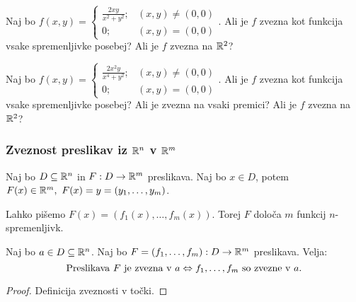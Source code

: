 \begin{zgled}
    Naj bo $f(x,y) = \begin{cases}
        \frac{2xy}{x^2+y^2}; &(x,y) \neq (0,0) \\
        0; &(x,y) = (0,0)
    \end{cases}$. Ali je $f$ zvezna kot funkcija vsake spremenljivke posebej? Ali je $f$ zvezna na $\mathbb{R}^2$?
\end{zgled}

\begin{zgled}
    Naj bo $f(x,y) = \begin{cases}
        \frac{2x^2y}{x^4+y^2}; &(x,y) \neq (0,0) \\
        0; &(x,y) = (0,0)
    \end{cases}$. Ali je $f$ zvezna kot funkcija vsake spremenljivke posebej? Ali je zvezna na vsaki premici? Ali je $f$ zvezna na $\mathbb{R}^2$?
\end{zgled}

\newpage
\subsubsection{Zveznost preslikav iz $\mathbb{R}^n$ v $\mathbb{R}^m$}
Naj bo $D \subseteq \mathbb{R}^n$ in $F: D \to \mathbb{R}^m$ preslikava. Naj bo $x \in D$, potem $F(x) \in \mathbb{R}^m, \ F(x) = y = (y_1, \ldots, y_m)$.

Lahko pišemo $F(x) = (f_1(x), \ldots, f_m(x))$. Torej $F$ določa $m$ funkcij $n$-spremenljivk.

\begin{trditev}
    Naj bo $a \in D \subseteq \mathbb{R}^n$. Naj bo $F=(f_1, \ldots, f_m): D \to \mathbb{R}^m$ preslikava. Velja:
    $$\text{Preslikava } F \text{ je zvezna v } a \Leftrightarrow f_1,\ldots, f_m \text{ so zvezne v } a.$$
\end{trditev}

\begin{proof}
    Definicija zveznosti v točki.
\end{proof}